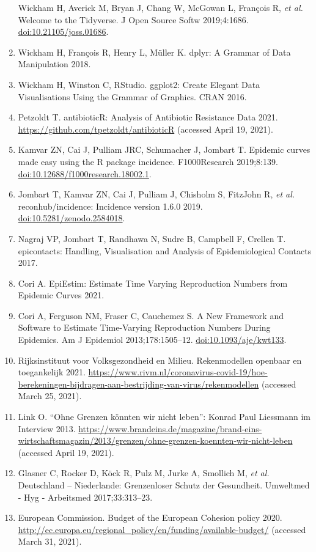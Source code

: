 \documentclass[
]{book}
\begin{document}
\begin{enumerate}
  Wickham H, Averick M, Bryan J, Chang W, McGowan L, François R, \emph{et al.} Welcome to the Tidyverse. J Open Source Softw 2019;4:1686. \url{doi:10.21105/joss.01686}.
\item
  Wickham H, François R, Henry L, Müller K. dplyr: A Grammar of Data Manipulation 2018.
\item
  Wickham H, Winston C, RStudio. ggplot2: Create Elegant Data Visualisations Using the Grammar of Graphics. CRAN 2016.
\item
  Petzoldt T. antibioticR: Analysis of Antibiotic Resistance Data 2021. \url{https://github.com/tpetzoldt/antibioticR} (accessed April 19, 2021).
\item
  Kamvar ZN, Cai J, Pulliam JRC, Schumacher J, Jombart T. Epidemic curves made easy using the R package incidence. F1000Research 2019;8:139. \url{doi:10.12688/f1000research.18002.1}.
\item
  Jombart T, Kamvar ZN, Cai J, Pulliam J, Chisholm S, FitzJohn R, \emph{et al.} reconhub/incidence: Incidence version 1.6.0 2019. \url{doi:10.5281/zenodo.2584018}.
\item
  Nagraj VP, Jombart T, Randhawa N, Sudre B, Campbell F, Crellen T. epicontacts: Handling, Visualisation and Analysis of Epidemiological Contacts 2017.
\item
  Cori A. EpiEstim: Estimate Time Varying Reproduction Numbers from Epidemic Curves 2021.
\item
  Cori A, Ferguson NM, Fraser C, Cauchemez S. A New Framework and Software to Estimate Time-Varying Reproduction Numbers During Epidemics. Am J Epidemiol 2013;178:1505--12. \url{doi:10.1093/aje/kwt133}.
\item
  Rijksinstituut voor Volksgezondheid en Milieu. Rekenmodellen openbaar en toegankelijk 2021. \url{https://www.rivm.nl/coronavirus-covid-19/hoe-berekeningen-bijdragen-aan-bestrijding-van-virus/rekenmodellen} (accessed March 25, 2021).
\item
  Link O. ``Ohne Grenzen könnten wir nicht leben'': Konrad Paul Liessmann im Interview 2013. \url{https://www.brandeins.de/magazine/brand-eins-wirtschaftsmagazin/2013/grenzen/ohne-grenzen-koennten-wir-nicht-leben} (accessed April 19, 2021).
\item
  Glasner C, Rocker D, Köck R, Pulz M, Jurke A, Smollich M, \emph{et al.} Deutschland -- Niederlande: Grenzenloser Schutz der Gesundheit. Umweltmed - Hyg - Arbeitsmed 2017;33:313--23.
\item
  European Commission. Budget of the European Cohesion policy 2020. \url{http://ec.europa.eu/regional_policy/en/funding/available-budget/} (accessed March 31, 2021).

\end{enumerate}
\end{document}

